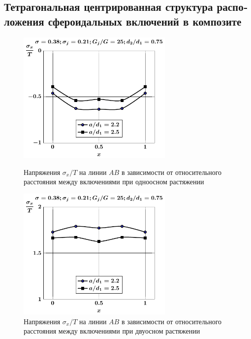 \begin{russian}
%

\subsection{Тетрагональная центрированная структура расположения сфероидальных включений в композите}

\begin{figure}[h!]
\centering\footnotesize
\parbox[b]{7.5cm}{\centering\includegraphics[width=7.6cm]{inc9-a-d75-g25-t1-sig_x.pdf}
\caption{Напряжения $\sigma_x/T$ на линии $AB$ в зависимости от относительного расстояния между включениями при одноосном растяжении
\label{f:9:69}}}\hfil\hfil
\parbox[b]{7.5cm}{\centering\includegraphics[width=7.6cm]{inc9-a-d75-g25-t2-sig_x.pdf}
\caption{Напряжения $\sigma_x/T$ на линии $AB$ в зависимости от относительного расстояния между включениями при двуосном растяжении
\label{f:9:70}}}
\end{figure}


\end{russian}
